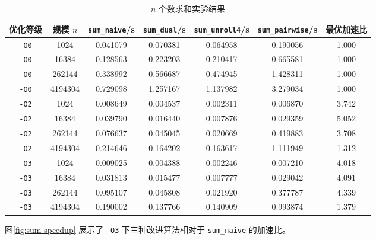 \documentclass[a4paper]{article}
\begin{document}
\begin{table}[H]
  \centering
  \small
  \begin{tabular}{ccccccc}
  \toprule
  优化等级 & 规模 $n$ & \texttt{sum\_naive}/s & \texttt{sum\_dual}/s & \texttt{sum\_unroll4}/s & \texttt{sum\_pairwise}/s & 最优加速比 \\
  \midrule
  \texttt{-O0} & 1024    & 0.041079 & 0.070381 & 0.064958 & 0.190056 & 1.000 \\
  \texttt{-O0} & 16384   & 0.128563 & 0.223203 & 0.210417 & 0.665581 & 1.000 \\
  \texttt{-O0} & 262144  & 0.338992 & 0.566687 & 0.474945 & 1.428311 & 1.000 \\
  \texttt{-O0} & 4194304 & 0.729098 & 1.257167 & 1.137982 & 3.279034 & 1.000 \\
  \midrule
  \texttt{-O2} & 1024    & 0.008649 & 0.004537 & 0.002311 & 0.006870 & 3.742 \\
  \texttt{-O2} & 16384   & 0.039790 & 0.016440 & 0.007876 & 0.029359 & 5.052 \\
  \texttt{-O2} & 262144  & 0.076637 & 0.045045 & 0.020669 & 0.419883 & 3.708 \\
  \texttt{-O2} & 4194304 & 0.214646 & 0.164202 & 0.163617 & 1.111949 & 1.312 \\
  \midrule
  \texttt{-O3} & 1024    & 0.009025 & 0.004388 & 0.002246 & 0.007210 & 4.018 \\
  \texttt{-O3} & 16384   & 0.031813 & 0.015477 & 0.007777 & 0.029042 & 4.091 \\
  \texttt{-O3} & 262144  & 0.095107 & 0.045808 & 0.021920 & 0.377787 & 4.339 \\
  \texttt{-O3} & 4194304 & 0.190002 & 0.137766 & 0.140909 & 0.993874 & 1.379 \\
  \bottomrule
  \end{tabular}
  \caption{$n$ 个数求和实验结果}
  \label{tab:sum}
\end{table}

图\ref{fig:sum-speedup} 展示了 \texttt{-O3} 下三种改进算法相对于 \texttt{sum\_naive} 的加速比。
\end{document}
